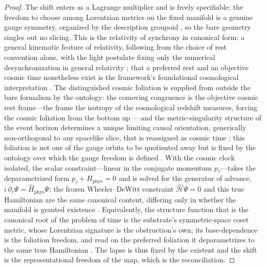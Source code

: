 \documentclass[11pt,a4paper]{article}
\theoremstyle{plain}
\theoremstyle{definition}
\theoremstyle{remark}
\begin{document}
\begin{proof}
The shift enters as a Lagrange multiplier and is freely specifiable; the freedom to choose among Lorentzian metrics on the fixed manifold is a genuine gauge symmetry, organized by the description groupoid \cite{JanzenGroupoid}, so the bare geometry singles out no slicing. This is the relativity of synchrony in canonical form: a general kinematic feature of relativity, following from the choice of rest convention alone, with the light postulate fixing only the numerical desynchronization in general relativity \cite{JanzenTrope, JanzenMisconstrue, JanzenWildGoose}; that a preferred rest and an objective cosmic time nonetheless exist is the framework's foundational cosmological interpretation \cite{Janzen2015, JanzenThesis}. The distinguished cosmic foliation is supplied from outside the bare formalism by the ontology: the comoving congruence is the objective cosmic rest frame---the frame the isotropy of the cosmological redshift measures, forcing the cosmic foliation from the bottom up~\cite{JanzenModernParallax}---and the metric-singularity structure of the event horizon determines a unique limiting causal orientation, generically non-orthogonal to any spacelike slice, that is reassigned as cosmic time \cite{JanzenBHcausality}; this foliation is not one of the gauge orbits to be quotiented away but is fixed by the ontology over which the gauge freedom is defined \cite{JanzenCanonicalTime}. With the cosmic clock isolated, the scalar constraint---linear in the conjugate momentum $p_\tau$---takes the deparametrized form $p_\tau+H_{\mathrm{phys}}=0$ and is solved for the generator of advance, $i\,\partial_\tau\Psi=\hat H_{\mathrm{phys}}\Psi$; the frozen Wheeler--DeWitt constraint $\hat{\mathcal H}\Psi=0$ and this true Hamiltonian are the same canonical content, differing only in whether the manifold is granted existence \cite{JanzenCanonicalTime}. Equivalently, the structure function that is the canonical root of the problem of time is the substrate's symmetric-space coset metric, whose Lorentzian signature is the obstruction's own; its base-dependence is the foliation freedom, and read on the preferred foliation it deparametrizes to the same true Hamiltonian \cite{JanzenAlgebroid}. The lapse is thus fixed by the existent and the shift is the representational freedom of the map, which is the reconciliation.
\end{proof}
\end{document}
